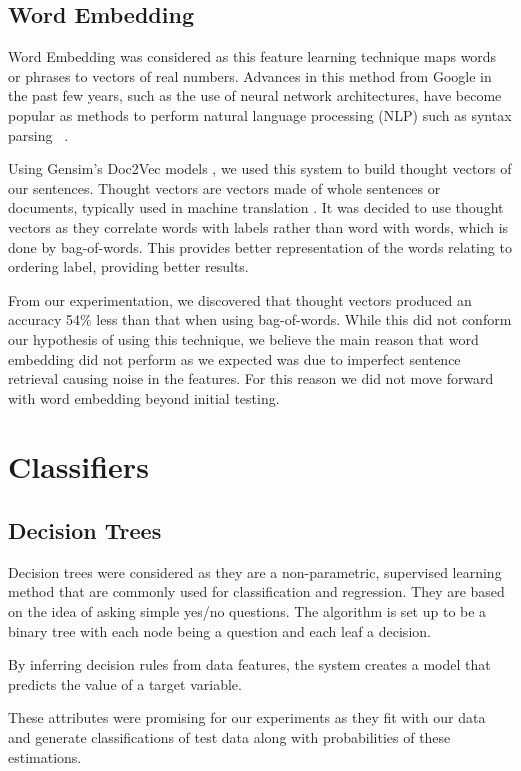 \documentclass[bsc,frontabs,twoside,singlespacing,parskip,deptreport]{infthesis}     %
\begin{document}
\subsection{Word Embedding}\label{sec:word-embedding}
Word Embedding was considered as this feature learning technique maps words or phrases to vectors of real numbers.
Advances in this method from Google in the past few years, such as the use of neural network architectures, have become
popular as methods to perform natural language processing (NLP) such as syntax parsing ~\cite{socher2013parsing}.

Using Gensim's Doc2Vec models \cite{rehurek_lrec}, we used this system to build thought vectors of our sentences.
Thought vectors are vectors made of whole sentences or documents, typically used in machine translation \cite{deeplearning4j}.
It was decided to use thought vectors as they correlate words with labels rather than word with words, which is done by bag-of-words.
This provides better representation of the words relating to ordering label, providing better results.



From our experimentation, we discovered that thought vectors produced an accuracy 54\% less than that when
using bag-of-words. While this did not conform our hypothesis of using this technique, we believe
the main reason that word embedding did not perform as we expected was due to imperfect sentence retrieval causing noise in
the features. For this reason we did not move forward with word embedding beyond initial testing.

\section{Classifiers}\label{sec:classifiers}
\subsection{Decision Trees}
Decision trees were considered as they are a non-parametric, supervised learning method that are commonly used for
classification and regression.
They are based on the idea of asking simple yes/no questions. The algorithm is set up to be a binary tree with
each node being a question and each leaf a decision.

By inferring decision rules from data features, the system creates a model that predicts the value of a target variable.

These attributes were promising for our experiments as they fit with our data and generate
classifications of test data along with probabilities of these estimations.
\end{document}
